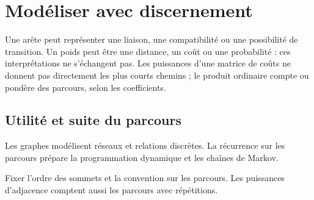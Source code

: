 \documentclass[../cours_tle.tex]{subfiles}
\begin{document}
\section{Modéliser avec discernement}
Une arête peut représenter une liaison, une compatibilité ou une possibilité de transition. Un poids peut être une distance, un coût ou une probabilité : ces interprétations ne s'échangent pas.
Les puissances d'une matrice de coûts ne donnent pas directement les plus courts chemins ; le produit ordinaire compte ou pondère des parcours, selon les coefficients.
\begin{finchapitre}
\section{Utilité et suite du parcours}
Les graphes modélisent réseaux et relations discrètes. La récurrence sur les parcours prépare la programmation dynamique et les chaînes de Markov.
\begin{retenir}
Fixer l'ordre des sommets et la convention sur les parcours. Les puissances d'adjacence comptent aussi les parcours avec répétitions.
\end{retenir}
\end{finchapitre}
\end{document}
